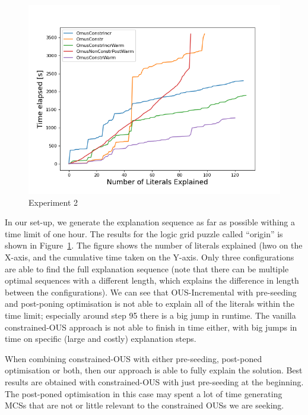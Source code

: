 \begin{figure}[t]
    \centering
    \includegraphics[width=\columnwidth]{figures/omusConstrCumulative.png}
    \caption{Experiment 2}
    \label{fig:exp2}
\end{figure}

In our set-up, we generate the explanation sequence as far as possible withing a time limit of one hour. 
The results for the logic grid puzzle called ``origin'' is shown in Figure~\ref{fig:exp2}.
The figure shows the number of literals explained (hwo  on the X-axis, and the cumulative time taken on the Y-axis. 
Only three configurations are able to find the full explanation sequence (note that there can be multiple optimal sequences with a different length, which explains the difference in length between the configurations).
We can see that OUS-Incremental with pre-seeding and post-poning optimisation is not able to explain all of the literals within the time limit; especially around step 95 there is a big jump in runtime. The vanilla constrained-OUS approach is not able to finish in time either, with big jumps in time on specific (large and costly) explanation steps.

When combining constrained-OUS with either pre-seeding, post-poned optimisation or both, then our approach is able to fully explain the solution. Best results are obtained with constrained-OUS with just pre-seeding at the beginning. The post-poned optimisation in this case may spent a lot of time generating MCSs that are not or little relevant to the constrained OUSs we are seeking. 

